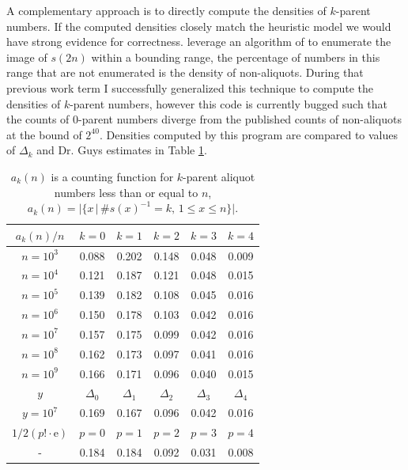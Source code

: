 \documentclass{article}
\theoremstyle{definition}
\begin{document}
%
A complementary approach is to directly compute the densities of $k$-parent numbers. If the computed densities closely match the heuristic model we would have strong evidence for correctness. \cite{chum_guy_jacobson_mosunov_2018} leverage an algorithm of \cite{pomYang} to enumerate the image of $s(2n)$ within a bounding range, the percentage of numbers in this range that are not enumerated is the density of non-aliquots. During that previous work term I successfully generalized this technique to compute the densities of $k$-parent numbers, however this code is currently bugged such that the counts of $0$-parent numbers diverge from the published counts of non-aliquots at the bound of $2^{40}$. Densities computed by this program are compared to values of $\Delta_k$ and Dr. Guys estimates in Table \ref{tab:computed}.
%
\begin{table}[H]
    \centering
    \begin{tabular}{| c | c | c | c | c | c |}
        \hline
        $a_k(n) / n$   &   $k = 0$     &   $k = 1$     &   $k = 2$     &   $k = 3$     &   $k = 4$     \\ 
        \hline
        $n = 10^3$  &   0.088    &  0.202   &   0.148    &   0.048    &  0.009    \\
        $n = 10^4$  &   0.121    &  0.187   &   0.121    &   0.048    &  0.015    \\
        $n = 10^5$  &   0.139    &  0.182   &   0.108    &   0.045    &  0.016    \\
        $n = 10^6$  &   0.150    &  0.178   &   0.103    &   0.042    &  0.016    \\
        $n = 10^7$  &   0.157    &  0.175   &   0.099    &   0.042    &  0.016    \\
        $n = 10^8$  &   0.162    &  0.173   &   0.097    &   0.041    &  0.016    \\
        $n = 10^9$  &   0.166    &  0.171   &   0.096    &   0.040    &  0.015    \\
        \hline
        \hline
        \hline
        $y$     &   $\Delta_0$  &   $\Delta_1$  &   $\Delta_2$  &   $\Delta_3$  &   $\Delta_4$  \\
        \hline
        $y = 10^7$  &   0.169   &   0.167   &   0.096   &   0.042   &   0.016   \\      
        \hline
        \hline
        \hline
        $1/2(p! \cdot \text{e})$   &   $p=0$    &   $p=1$    &   $p=2$    &   $p=3$   &   $p=4$    \\
        \hline
        -     &   0.184   &   0.184   &   0.092   &   0.031   &   0.008   \\
        \hline
    \end{tabular}
    \caption{$a_k(n)$ is a counting function for $k$-parent aliquot numbers less than or equal to $n$, $a_k(n) = |\{x \,| \, \#s(x)^{-1} = k,\, 1 \leq x \leq n\}|$.}
    \label{tab:computed}
\end{table}
\end{document}
